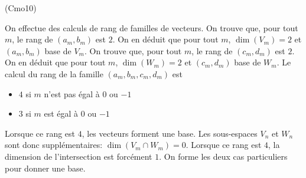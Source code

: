 \begin{tiny}(Cmo10)\end{tiny} On effectue des calculs de rang de familles de vecteurs.\newline
On trouve que, pour tout $m$, le rang de $(a_m,b_m)$ est $2$. On en déduit que pour tout $m$, $\dim(V_m)=2$ et $(a_m,b_m)$ base de $V_m$.\newline
On trouve que, pour tout $m$, le rang de $(c_m,d_m)$ est $2$. On en déduit que pour tout $m$, $\dim(W_m)=2$ et $(c_m,d_m)$ base de $W_m$.\newline
Le calcul du rang de la famille $(a_m,b_m,c_m,d_m)$ est 
\begin{itemize}
 \item $4$ si $m$ n'est pas égal à $0$ ou $-1$
 \item $3$ si $m$ est égal à $0$ ou $-1$
\end{itemize}
Lorsque ce rang est $4$, les vecteurs forment une base. Les sous-espaces $V_n$ et $W_n$ sont donc supplémentaires: $\dim(V_m\cap W_m)=0$.\newline
Lorsque ce rang est $4$, la dimension de l'intersection est forcément $1$. On forme les deux cas particuliers pour donner une base.